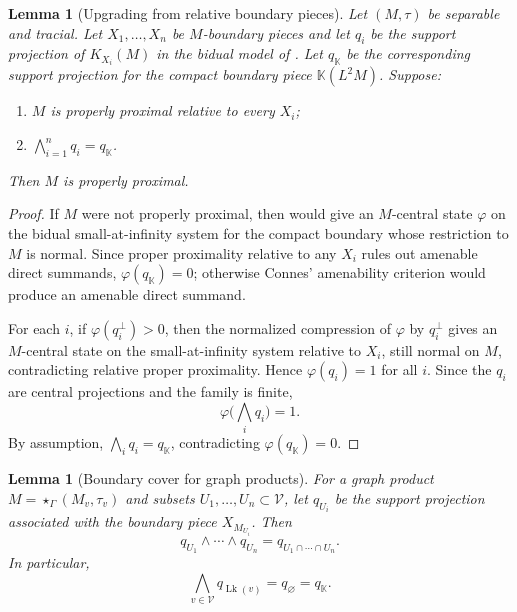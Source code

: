 \documentclass[11pt]{amsart}
\newtheorem{lemma}[theorem]{Lemma}
\theoremstyle{definition}
\newcommand{\V}{\mathcal V}
\newcommand{\Lk}{\operatorname{Lk}}
\newcommand{\K}{\mathbb K}
\begin{document}
\begin{lemma}[Upgrading from relative boundary pieces]\label{lem:upgrade}
Let $(M,\tau)$ be separable and tracial.  Let $X_1,\dots,X_n$ be $M$-boundary pieces and let $q_i$ be the support projection of $K_{X_i}(M)$ in the bidual model of \cite[Section 8]{DKEP}.  Let $q_{\K}$ be the corresponding support projection for the compact boundary piece $\K(L^2M)$.  Suppose:
\begin{enumerate}[label=(\roman*)]
\item $M$ is properly proximal relative to every $X_i$;
\item $\bigwedge_{i=1}^n q_i=q_{\K}$.
\end{enumerate}
Then $M$ is properly proximal.
\end{lemma}

\begin{proof}
If $M$ were not properly proximal, then \cite[Theorem 8.5]{DKEP} would give an $M$-central state $\varphi$ on the bidual small-at-infinity system for the compact boundary whose restriction to $M$ is normal.  Since proper proximality relative to any $X_i$ rules out amenable direct summands, $\varphi(q_{\K})=0$; otherwise Connes' amenability criterion would produce an amenable direct summand.

For each $i$, if $\varphi(q_i^\perp)>0$, then the normalized compression of $\varphi$ by $q_i^\perp$ gives an $M$-central state on the small-at-infinity system relative to $X_i$, still normal on $M$, contradicting relative proper proximality.  Hence $\varphi(q_i)=1$ for all $i$.  Since the $q_i$ are central projections and the family is finite,
\[
\varphi\Big(\bigwedge_i q_i\Big)=1.
\]
By assumption, $\bigwedge_i q_i=q_{\K}$, contradicting $\varphi(q_{\K})=0$.
\end{proof}

\begin{lemma}[Boundary cover for graph products]\label{lem:boundary-cover}
For a graph product $M=\star_{\Gamma}(M_v,\tau_v)$ and subsets $U_1,\dots,U_n\subset \V$, let $q_{U_i}$ be the support projection associated with the boundary piece $X_{M_{U_i}}$.  Then
\[
q_{U_1}\wedge\cdots\wedge q_{U_n}=q_{U_1\cap\cdots\cap U_n}.
\]
In particular,
\[
\bigwedge_{v\in \V} q_{\Lk(v)}=q_\varnothing=q_{\K}.
\]
\end{lemma}
\end{document}
